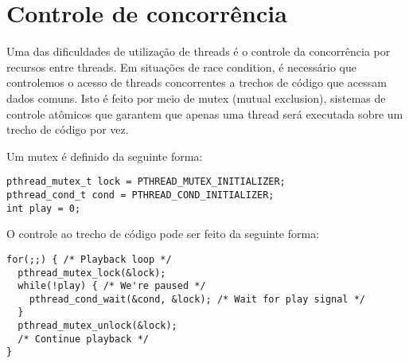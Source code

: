 \section{Controle de concorrência}

Uma das dificuldades de utilização de threads é o controle da concorrência por
recursos entre threads. Em situações de race condition, é necessário que
controlemos o acesso de threads concorrentes a trechos de código que acessam
dados comuns. Isto é feito por meio de mutex (mutual exclusion), sistemas de
controle atômicos que garantem que apenas uma thread será executada sobre um
trecho de código por vez.

Um mutex é definido da seguinte forma:

\begin{lstlisting}
pthread_mutex_t lock = PTHREAD_MUTEX_INITIALIZER;
pthread_cond_t cond = PTHREAD_COND_INITIALIZER;
int play = 0;
\end{lstlisting}

O controle ao trecho de código pode ser feito da seguinte forma:

\begin{lstlisting}
for(;;) { /* Playback loop */
  pthread_mutex_lock(&lock);
  while(!play) { /* We're paused */
    pthread_cond_wait(&cond, &lock); /* Wait for play signal */
  }
  pthread_mutex_unlock(&lock);
  /* Continue playback */
}
\end{lstlisting}

